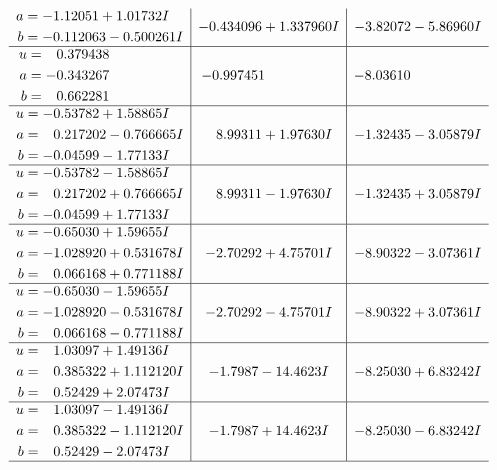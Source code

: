 \documentclass[1p]{elsarticle_modified}
\theoremstyle{definition}
\begin{document}
$$\begin{array}{c|c|c}
\begin{aligned}
a &= -1.12051 + 1.01732 I \\
b &= -0.112063 - 0.500261 I\end{aligned}
 & -0.434096 + 1.337960 I & -3.82072 - 5.86960 I \\ \hline\begin{aligned}
u &= \phantom{-}0.379438\phantom{ +0.000000I} \\
a &= -0.343267\phantom{ +0.000000I} \\
b &= \phantom{-}0.662281\phantom{ +0.000000I}\end{aligned}
 & -0.997451\phantom{ +0.000000I} & -8.03610\phantom{ +0.000000I} \\ \hline\begin{aligned}
u &= -0.53782 + 1.58865 I \\
a &= \phantom{-}0.217202 - 0.766665 I \\
b &= -0.04599 - 1.77133 I\end{aligned}
 & \phantom{-}8.99311 + 1.97630 I & -1.32435 - 3.05879 I \\ \hline\begin{aligned}
u &= -0.53782 - 1.58865 I \\
a &= \phantom{-}0.217202 + 0.766665 I \\
b &= -0.04599 + 1.77133 I\end{aligned}
 & \phantom{-}8.99311 - 1.97630 I & -1.32435 + 3.05879 I \\ \hline\begin{aligned}
u &= -0.65030 + 1.59655 I \\
a &= -1.028920 + 0.531678 I \\
b &= \phantom{-}0.066168 + 0.771188 I\end{aligned}
 & -2.70292 + 4.75701 I & -8.90322 - 3.07361 I \\ \hline\begin{aligned}
u &= -0.65030 - 1.59655 I \\
a &= -1.028920 - 0.531678 I \\
b &= \phantom{-}0.066168 - 0.771188 I\end{aligned}
 & -2.70292 - 4.75701 I & -8.90322 + 3.07361 I \\ \hline\begin{aligned}
u &= \phantom{-}1.03097 + 1.49136 I \\
a &= \phantom{-}0.385322 + 1.112120 I \\
b &= \phantom{-}0.52429 + 2.07473 I\end{aligned}
 & -1.7987 - 14.4623 I & -8.25030 + 6.83242 I \\ \hline\begin{aligned}
u &= \phantom{-}1.03097 - 1.49136 I \\
a &= \phantom{-}0.385322 - 1.112120 I \\
b &= \phantom{-}0.52429 - 2.07473 I\end{aligned}
 & -1.7987 + 14.4623 I & -8.25030 - 6.83242 I\\
 \hline 
 \end{array}$$\newpage\newpage\renewcommand{\arraystretch}{1}
\end{document}

